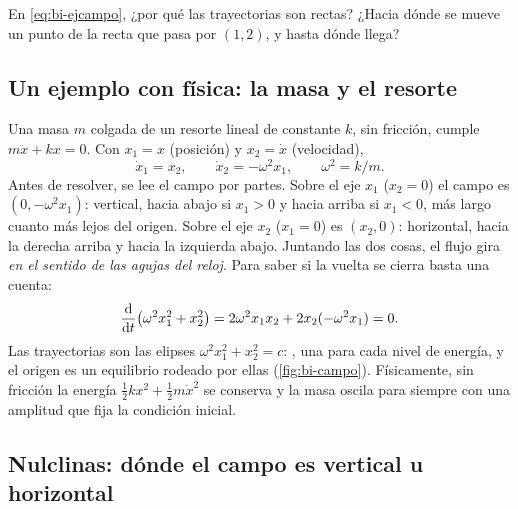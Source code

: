 \begin{pausa}
En \eqref{eq:bi-ejcampo}, ¿por qué las trayectorias son rectas? ¿Hacia dónde se mueve un punto de la recta que pasa por $(1,2)$, y hasta dónde llega?
\end{pausa}

\subsection{Un ejemplo con física: la masa y el resorte}

Una masa $m$ colgada de un resorte lineal de constante $k$, sin fricción, cumple $m\ddot x+kx=0$. Con $x_1=x$ (posición) y $x_2=\dot x$ (velocidad),
\begin{equation}
  \dot x_1=x_2,\qquad \dot x_2=-\omega^2x_1,\qquad \omega^2=k/m .
  \label{eq:bi-resorte}
\end{equation}
Antes de resolver, se lee el campo por partes. Sobre el eje $x_1$ ($x_2=0$) el campo es $(0,-\omega^2x_1)$: vertical, hacia abajo si $x_1>0$ y hacia arriba si $x_1<0$, más largo cuanto más lejos del origen. Sobre el eje $x_2$ ($x_1=0$) es $(x_2,0)$: horizontal, hacia la derecha arriba y hacia la izquierda abajo. Juntando las dos cosas, el flujo gira \emph{en el sentido de las agujas del reloj}. Para saber si la vuelta se cierra basta una cuenta:
\[
  \frac{\mathrm{d}}{\mathrm{d} t}\bigl(\omega^2x_1^2+x_2^2\bigr)=2\omega^2x_1x_2+2x_2(-\omega^2x_1)=0 .
\]
Las trayectorias son las elipses $\omega^2x_1^2+x_2^2=c$: , una para cada nivel de energía, y el origen es un equilibrio rodeado por ellas (\cref{fig:bi-campo}). Físicamente, sin fricción la energía $\tfrac12kx^2+\tfrac12m\dot x^2$ se conserva y la masa oscila para siempre con una amplitud que fija la condición inicial.

\subsection{Nulclinas: dónde el campo es vertical u horizontal}

